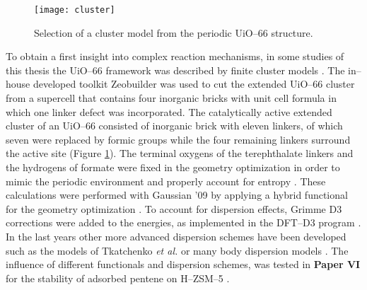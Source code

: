 \begin{figure}[!h]
	\centering
	\texttt{[image: cluster]}
	\caption{Selection of a cluster model from the periodic UiO--66 structure.}
	\label{fig:cluster}
\end{figure}
\npar
To obtain a first insight into complex reaction mechanisms, in some studies of
this thesis the UiO--66 framework was described by finite cluster
models \cite{Hajek2015, Vandichel2015, Caratelli2017}. The in--house developed
toolkit Zeobuilder \cite{Verstraelen2008} was used to cut the extended UiO--66
cluster from a supercell that contains four inorganic bricks with unit cell
formula  in which one linker defect was incorporated. The catalytically active extended cluster of an UiO--66 consisted of inorganic
 brick with eleven linkers, of which seven were replaced by
formic groups while the four remaining linkers surround the active site (Figure
\ref{fig:cluster}).
The terminal oxygens of the terephthalate linkers and the hydrogens of formate
were fixed in the geometry optimization in order to mimic the periodic
environment and properly account for entropy \cite{DeWispelaere2018}. These
calculations were performed with Gaussian '09 by applying a hybrid functional
for the geometry optimization \cite{Gaussian}. To account for dispersion
effects, Grimme D3 corrections were added to the energies, as implemented in the
DFT--D3 program \cite{Grimme2010}. In the last years other more advanced
dispersion schemes have been developed such as the models of Tkatchenko \textit{et al.}\cite{Ambrosetti2014} or many body
dispersion models \cite{Bucko2016}. The influence of different functionals and
dispersion schemes, was tested in \textbf{Paper VI} for
the stability of adsorbed pentene on H--ZSM--5 \cite{Hajek2016}. 

